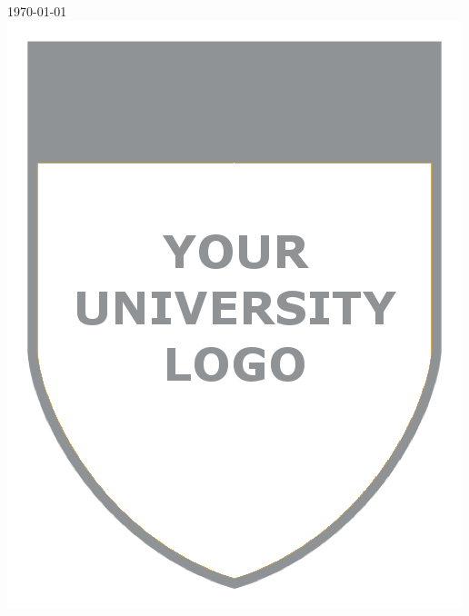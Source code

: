 \documentclass[11pt]{article}
\begin{document}
\begin{titlepage}
{\large \today}\\[0.1cm] %


\includegraphics{figures/logo.png}\\[0cm] %
 

\vfill %

\end{titlepage}








\end{document}
